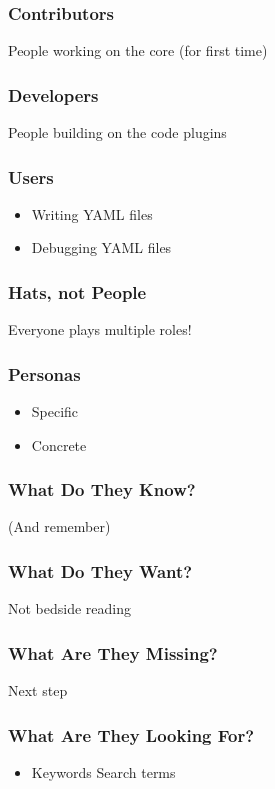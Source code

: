 \begin{frame}
\frametitle{Contributors}

People working on the core \pause (for first time)
\end{frame}

\begin{frame}
\frametitle{Developers}

People building on the code \pause plugins
\end{frame}

\begin{frame}
\frametitle{Users}

\begin{itemize}
\item Writing YAML files
\item Debugging YAML files
\end{itemize}

\end{frame}

\begin{frame}
\frametitle{Hats, not People}

Everyone plays multiple roles!
\end{frame}

\begin{frame}
\frametitle{Personas}

\begin{itemize}
\item Specific
\item Concrete
\end{itemize}

\end{frame}

\begin{frame}
\frametitle{What Do They Know?}

(And remember)
\end{frame}

\begin{frame}
\frametitle{What Do They Want?}

Not bedside reading
\end{frame}

\begin{frame}
\frametitle{What Are They Missing?}

Next step
\end{frame}

\begin{frame}
\frametitle{What Are They Looking For?}

\begin{itemize}
\item Keywords
\items Search terms
\end{itemize}
\end{frame}

